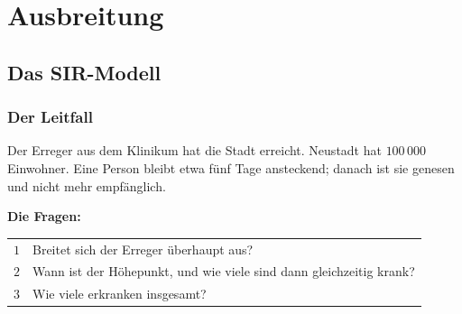 \part{Ausbreitung}

\chapter{Das SIR-Modell}

\section{Der Leitfall}

\begin{merksatz}
Der Erreger aus dem Klinikum hat die Stadt erreicht. Neustadt hat $100\,000$ Einwohner. Eine Person bleibt etwa fünf Tage ansteckend; danach ist sie genesen und nicht mehr empfänglich.

\textbf{Die Fragen:}
\begin{center}
\renewcommand{\arraystretch}{1.48}
\begin{tabular}{@{}P{1.0cm}P{7.4cm}@{}}
\toprule
$1$ & Breitet sich der Erreger überhaupt aus?\\
$2$ & Wann ist der Höhepunkt, und wie viele sind dann gleichzeitig krank?\\
$3$ & Wie viele erkranken insgesamt?\\
\bottomrule
\end{tabular}
\end{center}

\begin{center}
\begin{minipage}{0.88\textwidth}
\end{minipage}
\end{center}
\end{merksatz}

